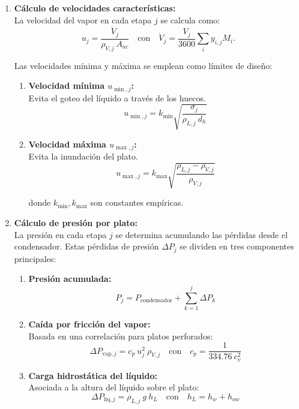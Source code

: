 \begin{enumerate}
    \item \textbf{Cálculo de velocidades características:}\\
          La velocidad del vapor en cada etapa $j$ se calcula como:
          $$
              u_j = \frac{\dot{V}_j}{\rho_{V,j}\ A_{ac}}
              \quad\text{con}\quad
              \dot{V}_j = \frac{V_j}{3600}\sum_i y_{i,j} M_i.
          $$

          Las velocidades mínima y máxima se emplean como límites de diseño:
          \begin{enumerate}
              \item \textbf{Velocidad mínima $u_{\min,j}$:}\\
                    Evita el goteo del líquido a través de los huecos.
                    $$
                        u_{\min,j} = k_{\min} \sqrt{\frac{\sigma_j}{\rho_{L,j}\ d_h}}
                    $$
              \item \textbf{Velocidad máxima $u_{\max,j}$:}\\
                    Evita la inundación del plato.
                    $$
                        u_{\max,j} = k_{\max} \sqrt{\frac{\rho_{L,j} - \rho_{V,j}}{\rho_{V,j}}}
                    $$

                    donde $k_{\min}, k_{\max}$ son constantes empíricas.
          \end{enumerate}

    \item \textbf{Cálculo de presión por plato:}\\
          La presión en cada etapa $j$ se determina acumulando las pérdidas desde el condensador. Estas pérdidas de presión $\Delta P_j$ se dividen en tres componentes principales:
          \begin{enumerate}
              \item \textbf{Presión acumulada:}\\
                    $$
                        P_j = P_{\mathrm{condensador}} + \sum_{k=1}^j \Delta P_k
                    $$
              \item \textbf{Caída por fricción del vapor:}\\
                    Basada en una correlación para platos perforados:
                    $$
                        \Delta P_{\mathrm{vap},j} = c_p\ u_j^2\ \rho_{V,j}
                        \quad\text{con}\quad
                        c_p = \frac{1}{334.76\ c_v^2}
                    $$
              \item \textbf{Carga hidrostática del líquido:}\\
                    Asociada a la altura del líquido sobre el plato:
                    $$
                        \Delta P_{\mathrm{liq},j} = \rho_{L,j}\ g\ h_L
                        \quad\text{con}\quad
                        h_L = h_w + h_{ow}
                    $$


\end{enumerate}
\end{enumerate}
